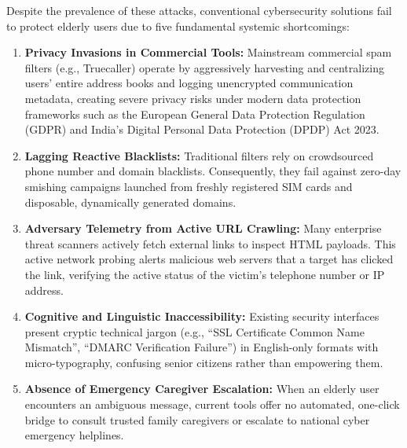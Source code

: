 \documentclass[conference]{IEEEtran}
\begin{document}
Despite the prevalence of these attacks, conventional cybersecurity solutions fail to protect elderly users due to five fundamental systemic shortcomings:
\begin{enumerate}
    \item \textbf{Privacy Invasions in Commercial Tools:} Mainstream commercial spam filters (e.g., Truecaller) operate by aggressively harvesting and centralizing users' entire address books and logging unencrypted communication metadata, creating severe privacy risks under modern data protection frameworks such as the European General Data Protection Regulation (GDPR) and India's Digital Personal Data Protection (DPDP) Act 2023.
    \item \textbf{Lagging Reactive Blacklists:} Traditional filters rely on crowdsourced phone number and domain blacklists. Consequently, they fail against zero-day smishing campaigns launched from freshly registered SIM cards and disposable, dynamically generated domains.
    \item \textbf{Adversary Telemetry from Active URL Crawling:} Many enterprise threat scanners actively fetch external links to inspect HTML payloads. This active network probing alerts malicious web servers that a target has clicked the link, verifying the active status of the victim's telephone number or IP address.
    \item \textbf{Cognitive and Linguistic Inaccessibility:} Existing security interfaces present cryptic technical jargon (e.g., ``SSL Certificate Common Name Mismatch'', ``DMARC Verification Failure'') in English-only formats with micro-typography, confusing senior citizens rather than empowering them.
    \item \textbf{Absence of Emergency Caregiver Escalation:} When an elderly user encounters an ambiguous message, current tools offer no automated, one-click bridge to consult trusted family caregivers or escalate to national cyber emergency helplines.
\end{enumerate}
\end{document}
